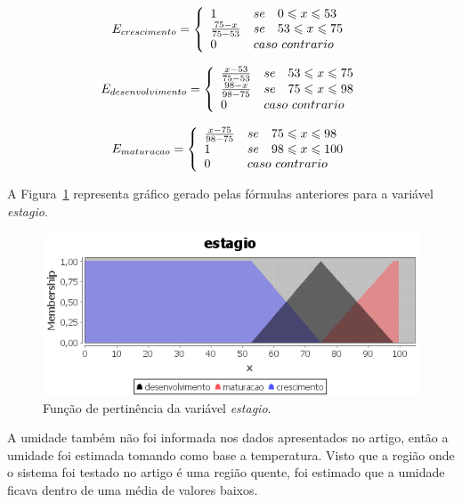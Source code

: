 \documentclass[
	article,			%
	11pt,				%
	oneside,			%
	a4paper,			%
	english,			%
	brazil,				%
	sumario=tradicional
	]{abntex2}
\begin{document}
\begin{multicols}{2}
$$
  E_{crescimento} = \left\{
  \begin{array}{lll}
  1 & se & 0 \leqslant x \leqslant 53 \\
  \frac{75 - x}{75 - 53} & se & 53 \leqslant x \leqslant 75 \\
  0 & \multicolumn{2}{l}{caso~contrario}
  \end{array}
  \right.
$$

$$
  E_{desenvolvimento} = \left\{
  \begin{array}{lll}
  \frac{x - 53}{75 - 53} & se & 53 \leqslant x \leqslant 75 \\
  \frac{98 - x}{98 - 75} & se & 75 \leqslant x \leqslant 98 \\
  0 & \multicolumn{2}{l}{caso~contrario}
  \end{array}
  \right.
$$

$$
  E_{maturacao} = \left\{
  \begin{array}{lll}
  \frac{x - 75}{98 - 75} & se & 75 \leqslant x \leqslant 98 \\
  1 & se & 98 \leqslant x \leqslant 100 \\
  0 & \multicolumn{2}{l}{caso~contrario}
  \end{array}
  \right.
$$

A Figura~\ref{fig:fuzzyestagio} representa gráfico gerado pelas fórmulas anteriores para a variável \textit{estagio}.

\begin{figure}[H]
  \centering
  \includegraphics[width=1\linewidth]{fuzzy_estagio}
  \caption{Função de pertinência da variável \textit{estagio}.}
  \label{fig:fuzzyestagio}
\end{figure}

A umidade também não foi informada nos dados apresentados no artigo, então a umidade foi estimada tomando como base a temperatura. Visto que a região onde o sistema foi testado no artigo é uma região quente, foi estimado que a umidade ficava dentro de uma média de valores baixos.


\end{multicols}
\end{document}
